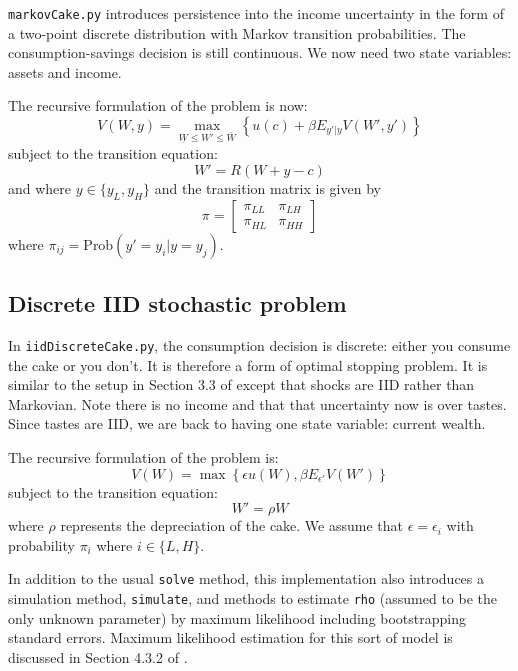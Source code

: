 \texttt{markovCake.py} introduces persistence into the income uncertainty in the form of a two-point discrete distribution with Markov transition probabilities. The consumption-savings decision is still continuous. We now need two state variables: assets and income.

The recursive formulation of the problem is now:
\begin{equation}
	V(W, y) = \max_{\underline{W} \leq W' \leq \overline{W}} \left\{ u(c) + \beta E_{y' | y} V(W', y') \right\}
\end{equation}
subject to the transition equation:
\begin{equation}
	W' = R (W + y - c)
\end{equation}
and where \(y \in \{y_L, y_H\}\) and the transition matrix is given by
\begin{equation}
	\pi = 
	\left[
	\begin{matrix}
		\pi_{LL} & \pi_{LH} \\
		\pi_{HL} & \pi_{HH}
	\end{matrix}
	\right]
\end{equation}
where \(\pi_{ij} = \text{Prob}(y' = y_i | y = y_j)\).

\subsection{Discrete IID stochastic problem}

In \texttt{iidDiscreteCake.py}, the consumption decision is discrete: either you consume the cake or you don't. It is therefore a form of optimal stopping problem. It is similar to the setup in Section 3.3 of \citet{adda2003dynamic} except that shocks are IID rather than Markovian. Note there is no income and that that uncertainty now is over tastes. Since tastes are IID, we are back to having one state variable: current wealth.

The recursive formulation of the problem is:
\begin{equation}
	V(W) = \max \left\{\epsilon u(W), \beta E_{\epsilon'} V(W') \right\}
\end{equation}
subject to the transition equation:
\begin{equation}
	W' = \rho W
\end{equation}
where \(\rho\) represents the depreciation of the cake. We assume that \(\epsilon = \epsilon_i\) with probability \(\pi_i\) where \(i \in \{L, H\}\).

In addition to the usual \texttt{solve} method, this implementation also introduces a simulation method, \texttt{simulate}, and methods to estimate \texttt{rho} (assumed to be the only unknown parameter) by maximum likelihood including bootstrapping standard errors. Maximum likelihood estimation for this sort of model is discussed in Section 4.3.2 of \citet{adda2003dynamic}.

